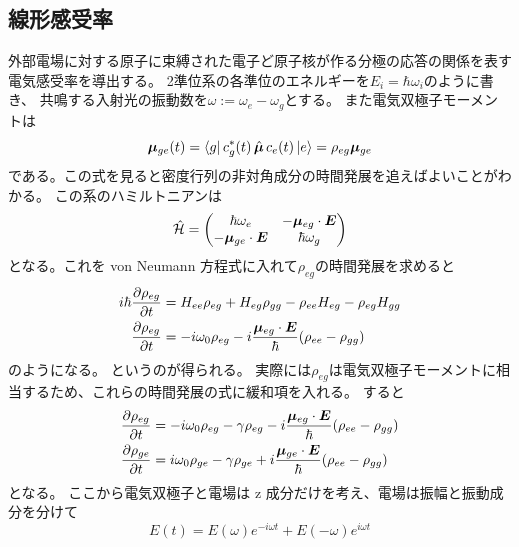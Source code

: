 \documentclass[11pt,dvipdfmx,a4paper]{jsarticle}
\begin{document}
\subsection{線形感受率}
外部電場に対する原子に束縛された電子ど原子核が作る分極の応答の関係を表す電気感受率を導出する。
2準位系の各準位のエネルギーを\(E_i = \hbar \omega_i\)のように書き、
共鳴する入射光の振動数を\(\omega := \omega_e -\omega_g\)とする。
また電気双極子モーメントは
\begin{equation}
	\vb*{\mu}_{ge}(t) = \bra{g}c_g^*(t)\,\hat{\vb*{\mu}}\,c_e(t)\ket{e}
	= \rho_{eg}\vb*{\mu}_{ge}
\end{equation}
である。この式を見ると密度行列の非対角成分の時間発展を追えばよいことがわかる。
この系のハミルトニアンは
\begin{equation}
	\hat{\mathcal{H}} =
	\begin{pmatrix}
		\hbar \omega_e  & -\vb*{\mu}_{eg}\cdot\vb*{E}\\
		-\vb*{\mu}_{ge}\cdot\vb*{E} & \hbar \omega_g
	\end{pmatrix}
\end{equation}
となる。これを von Neumann 方程式に入れて\(\rho_{eg}\)の時間発展を求めると
\begin{align}
	i\hbar \pdv{\rho_{eg}}{t} &= H_{ee}\rho_{eg} + H_{eg}\rho_{gg} - \rho_{ee} H_{eg} - \rho_{eg} H_{gg}\\
	\pdv{\rho_{eg}}{t} &= -i\omega_0\rho_{eg} -i\frac{\vb*{\mu}_{eg}\cdot \vb*{E}}{\hbar}(\rho_{ee}-\rho_{gg})
\end{align}
のようになる。
というのが得られる。
実際には\(\rho_{eg}\)は電気双極子モーメントに相当するため、これらの時間発展の式に緩和項を入れる。
すると
\begin{align}
	\pdv{\rho_{eg}}{t} &= -i\omega_0\rho_{eg} -\gamma\rho_{eg} -i\frac{\vb*{\mu}_{eg}\cdot \vb*{E}}{\hbar}(\rho_{ee}-\rho_{gg})\\
	\pdv{\rho_{ge}}{t} &=  i\omega_0\rho_{ge} -\gamma\rho_{ge} +i\frac{\vb*{\mu}_{ge}\cdot \vb*{E}}{\hbar}(\rho_{ee}-\rho_{gg})
\end{align}
となる。
ここから電気双極子と電場は z 成分だけを考え、電場は振幅と振動成分を分けて
\begin{equation}
	E(t) = E(\omega)e^{-i\omega t} + E(-\omega) e^{i\omega t} \label{eq:E_fourier}
\end{equation}
\end{document}
